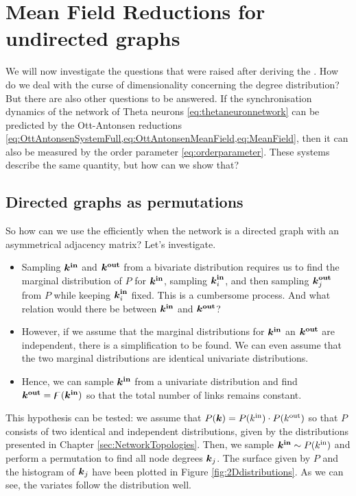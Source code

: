\newpage
\section{\mywork Mean Field Reductions for undirected graphs}
We will now investigate the questions that were raised after deriving the \MFR. How do we deal with the curse of dimensionality concerning the degree distribution? But there are also other questions to be answered. If the synchronisation dynamics of the network of Theta neurons \eqref{eq:thetaneuronnetwork} can be predicted by the Ott-Antonsen reductions \cref{eq:OttAntonsenSystemFull,eq:OttAntonsenMeanField,eq:MeanField}, then it can also be measured by the order parameter \eqref{eq:orderparameter}. These systems describe the same quantity, but how can we show that?


\subsection{Directed graphs as permutations}
So how can we use the \MFR efficiently when the network is a directed graph with an asymmetrical adjacency matrix? Let's investigate.
\begin{itemize}
\item Sampling ${\boldsymbol{k^{\rm in}}}$ and $\boldsymbol{{k^{\rm out}}}$ from a bivariate distribution requires us to find the marginal distribution of $P$ for ${\boldsymbol{k^{\rm in}}}$, sampling ${\boldsymbol{k}_i^{\bf in}}$, and then sampling ${\boldsymbol{k}_j^{\bf out}}$ from $P$ while keeping ${\boldsymbol{k}_i^{\bf in}}$ fixed. This is a cumbersome process. And what relation would there be between ${\boldsymbol{k^{\rm in}}}$ and $\boldsymbol{{k^{\rm out}}}$?
\item However, if we assume that the marginal distributions for ${\boldsymbol{k^{\rm in}}}$ an $\boldsymbol{{k^{\rm out}}}$ are independent, there is a simplification to be found. We can even assume that the two marginal distributions are identical univariate distributions. 
\item Hence, we can sample ${\boldsymbol{k^{\rm in}}}$ from a univariate distribution and find $\boldsymbol{{k^{\rm out}}} = {\digamma} ( {\boldsymbol{k^{\rm in}}} )$ so that the total number of links remains constant. 
\end{itemize}

This hypothesis can be tested: we assume that $P({\boldsymbol{k}}) = P({k^{\rm in}}) \cdot P({k^{\rm out}})$ so that $P$ consists of two identical and independent distributions, given by the distributions presented in Chapter \ref{sec:NetworkTopologies}. Then, we sample ${\boldsymbol{k^{\rm in}}} \sim P({k^{\rm in}})$ and perform a permutation to find all node degrees ${\boldsymbol{k}}_j$. The surface given by $P$ and the histogram of ${\boldsymbol{k}}_j$ have been plotted in Figure \ref{fig:2Ddistributions}. As we can see, the variates follow the distribution well. 

